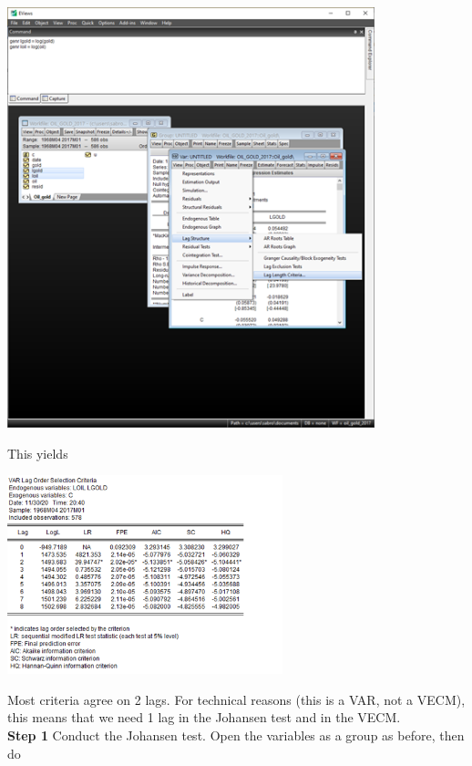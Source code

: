 \documentclass[11pt, a4paper]{article}
\begin{document}
\begin{enumerate}
\begin{enumerate}
\begin{center}
\includegraphics[width=0.8\textwidth]{johanseneviews3}
\end{center}
This yields
\begin{center}
\includegraphics[width=0.6\textwidth]{johanseneviews4}
\end{center}
Most criteria agree on 2 lags. For technical reasons (this is a VAR, not a VECM), this means that we need 1 lag in the Johansen test and in the VECM.\\
\noindent\textbf{Step 1} Conduct the Johansen test. Open the variables as a group as before, then do
\begin{center}

\end{center}
\end{enumerate}
\end{enumerate}
\end{document}
